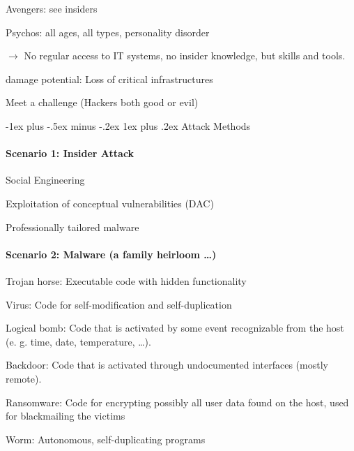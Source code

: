 \documentclass[a4paper]{article}
\makeatletter
\renewcommand{\subsubsection}{\@startsection{subsubsection}{3}{0mm}%
                {-1ex plus -.5ex minus -.2ex}%
                {1ex plus .2ex}%
                {\normalfont\small\bfseries}}
\makeatother
\begin{document}
\begin{multicols}{3}
\begin{itemize*}
\begin{itemize*}
\begin{itemize*}
                \item Avengers: see insiders
                \item Psychos: all ages, all types, personality disorder
                \item[$\rightarrow$] No regular access to IT systems, no insider knowledge, but skills and tools.
            \end{itemize*}
            \item damage potential: Loss of critical infrastructures
        \end{itemize*}
        \item Meet a challenge (Hackers both good or evil)
    \end{itemize*}

    \subsubsection{Attack Methods}
    \paragraph{Scenario 1: Insider Attack}
    \begin{itemize*}
        \item Social Engineering
        \item Exploitation of conceptual vulnerabilities (DAC)
        \item Professionally tailored malware
    \end{itemize*}

    \paragraph{Scenario 2: Malware (a family heirloom \dots )}
    \begin{itemize*}
        \item Trojan horse: Executable code with hidden functionality
        \item Virus: Code for self-modification and self-duplication
        \item Logical bomb: Code that is activated by some event recognizable from the host (e. g. time, date, temperature, \dots ).
        \item Backdoor: Code that is activated through undocumented interfaces (mostly remote).
        \item Ransomware: Code for encrypting possibly all user data found on the host, used for blackmailing the victims
        \item Worm: Autonomous, self-duplicating programs
    \end{itemize*}


\end{multicols}
\end{document}
